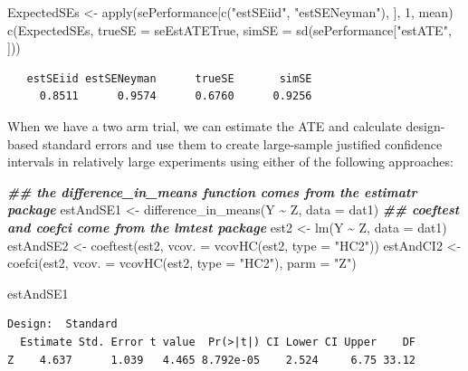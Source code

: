 \documentclass[
  12pt,
]{book}
\newenvironment{Shaded}{\begin{snugshade}}{\end{snugshade}}
\newcommand{\AttributeTok}[1]{\textcolor[rgb]{0.77,0.63,0.00}{#1}}
\newcommand{\DecValTok}[1]{\textcolor[rgb]{0.00,0.00,0.81}{#1}}
\newcommand{\DocumentationTok}[1]{\textcolor[rgb]{0.56,0.35,0.01}{\textbf{\textit{#1}}}}
\newcommand{\FunctionTok}[1]{\textcolor[rgb]{0.00,0.00,0.00}{#1}}
\newcommand{\NormalTok}[1]{#1}
\newcommand{\OtherTok}[1]{\textcolor[rgb]{0.56,0.35,0.01}{#1}}
\newcommand{\SpecialCharTok}[1]{\textcolor[rgb]{0.00,0.00,0.00}{#1}}
\newcommand{\StringTok}[1]{\textcolor[rgb]{0.31,0.60,0.02}{#1}}
\theoremstyle{definition}
\theoremstyle{definition}
\theoremstyle{definition}
\theoremstyle{remark}
\begin{document}
\begin{Shaded}
\begin{Highlighting}[]
\NormalTok{ExpectedSEs }\OtherTok{\textless{}{-}} \FunctionTok{apply}\NormalTok{(sePerformance[}\FunctionTok{c}\NormalTok{(}\StringTok{"estSEiid"}\NormalTok{, }\StringTok{"estSENeyman"}\NormalTok{), ], }\DecValTok{1}\NormalTok{, mean)}
\FunctionTok{c}\NormalTok{(ExpectedSEs, }\AttributeTok{trueSE =}\NormalTok{ seEstATETrue, }\AttributeTok{simSE =} \FunctionTok{sd}\NormalTok{(sePerformance[}\StringTok{"estATE"}\NormalTok{, ]))}
\end{Highlighting}
\end{Shaded}

\begin{verbatim}
   estSEiid estSENeyman      trueSE       simSE 
     0.8511      0.9574      0.6760      0.9256 
\end{verbatim}

When we have a two arm trial, we can estimate the ATE and calculate
design-based standard errors and use them to create large-sample
justified confidence intervals in relatively large experiments using
either of the following approaches:

\begin{Shaded}
\begin{Highlighting}[]
\DocumentationTok{\#\# the difference\_in\_means function comes from the estimatr package}
\NormalTok{estAndSE1 }\OtherTok{\textless{}{-}} \FunctionTok{difference\_in\_means}\NormalTok{(Y }\SpecialCharTok{\textasciitilde{}}\NormalTok{ Z, }\AttributeTok{data =}\NormalTok{ dat1)}
\DocumentationTok{\#\# coeftest and coefci come from the lmtest package}
\NormalTok{est2 }\OtherTok{\textless{}{-}} \FunctionTok{lm}\NormalTok{(Y }\SpecialCharTok{\textasciitilde{}}\NormalTok{ Z, }\AttributeTok{data =}\NormalTok{ dat1)}
\NormalTok{estAndSE2 }\OtherTok{\textless{}{-}} \FunctionTok{coeftest}\NormalTok{(est2, }\AttributeTok{vcov. =} \FunctionTok{vcovHC}\NormalTok{(est2, }\AttributeTok{type =} \StringTok{"HC2"}\NormalTok{))}
\NormalTok{estAndCI2 }\OtherTok{\textless{}{-}} \FunctionTok{coefci}\NormalTok{(est2, }\AttributeTok{vcov. =} \FunctionTok{vcovHC}\NormalTok{(est2, }\AttributeTok{type =} \StringTok{"HC2"}\NormalTok{), }\AttributeTok{parm =} \StringTok{"Z"}\NormalTok{)}

\NormalTok{estAndSE1}
\end{Highlighting}
\end{Shaded}

\begin{verbatim}
Design:  Standard 
  Estimate Std. Error t value  Pr(>|t|) CI Lower CI Upper    DF
Z    4.637      1.039   4.465 8.792e-05    2.524     6.75 33.12
\end{verbatim}
\end{document}
